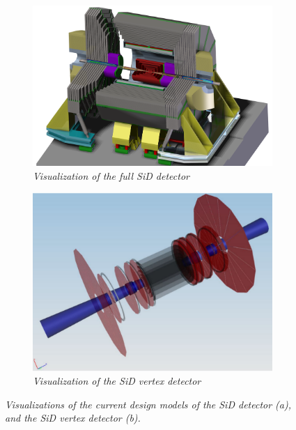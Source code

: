 \begin{figure}
\centering
\begin{subfigure}[t]{0.45\textwidth}
\centering
\includegraphics[width=1.05\textwidth]{figures/SiD_new.png}
\caption{\textit{Visualization of the full SiD detector}}
\end{subfigure}
\hspace*{0.3cm}
\begin{subfigure}[t]{0.45\textwidth}
\centering
\includegraphics[width=\textwidth]{figures/SiDVertexDetector.png}
\caption{\textit{Visualization of the SiD vertex detector}}
\end{subfigure}
\caption{\textit{Visualizations of the current design models of the SiD detector (a), and the SiD vertex detector (b).}}
\label{fig:SiD}
\end{figure}
\newpage
